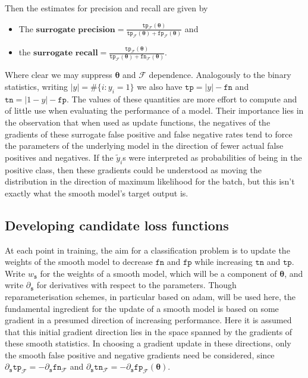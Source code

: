 \documentclass[10pt,a4paper]{article}
\begin{document}
Then the estimates for precision and recall are given by
\begin{itemize}
  \item The $\textbf{surrogate precision}=\frac{\texttt{tp}_\mathcal F(\boldsymbol\theta)}{\texttt{tp}_\mathcal F(\boldsymbol\theta)+\texttt{fp}_\mathcal F(\boldsymbol\theta)}$ and
  \item the $\textbf{surrogate recall}=\frac{\texttt{tp}_\mathcal F(\boldsymbol\theta)}{\texttt{tp}_\mathcal F(\boldsymbol\theta)+\texttt{fn}_\mathcal F(\boldsymbol\theta)}$.
\end{itemize}
Where clear we may suppress $\boldsymbol\theta$ and $\mathcal F$ dependence.
Analogously to the binary statistics, writing $|y|=\#\{i:y_i=1\}$ we also have $\texttt{tp}=|y|-\texttt{fn}$ and $\texttt{tn}=|1-y|-\texttt{fp}$.
The values of these quantities are more effort to compute and of little use when evaluating the performance of a model.
Their importance lies in the observation that when used as update functions, the negatives of the gradients of these surrogate false positive and false negative rates tend to force the parameters of the underlying model in the direction of fewer actual false positives and negatives.
If the $\tilde y_i$s were interpreted as probabilities of being in the positive class, then these gradients could be understood as moving the distribution in the direction of maximum likelihood for the batch, but this isn't exactly what the smooth model's target output is.
\subsection{Developing candidate loss functions}
At each point in training, the aim for a classification problem is to update the weights of the smooth model to decrease $\texttt{fn}$ and $\texttt{fp}$ while increasing $\texttt{tn}$ and $\texttt{tp}$.
Write $w_\texttt{s}$ for the weights of a smooth model, which will be a component of $\boldsymbol\theta$, and write $\partial_\texttt{s}$ for derivatives with respect to the parameters.
Though reparameterisation schemes, in particular based on adam, will be used here, the fundamental ingredient for the update of a smooth model is based on some gradient in a presumed direction of increasing performance.
Here it is assumed that this initial gradient direction lies in the space spanned by the gradients of these smooth statistics.
In choosing a gradient update in these directions, only the smooth false positive and negative gradients need be considered, since $\partial_\texttt{s}\texttt{tp}_{\mathcal F}=-\partial_\texttt{s}\texttt{fn}_{\mathcal F}$ and $\partial_\texttt{s}\texttt{tn}_{\mathcal F}=-\partial_\texttt{s}\texttt{fp}_{\mathcal F}(\boldsymbol\theta)$.
\end{document}
